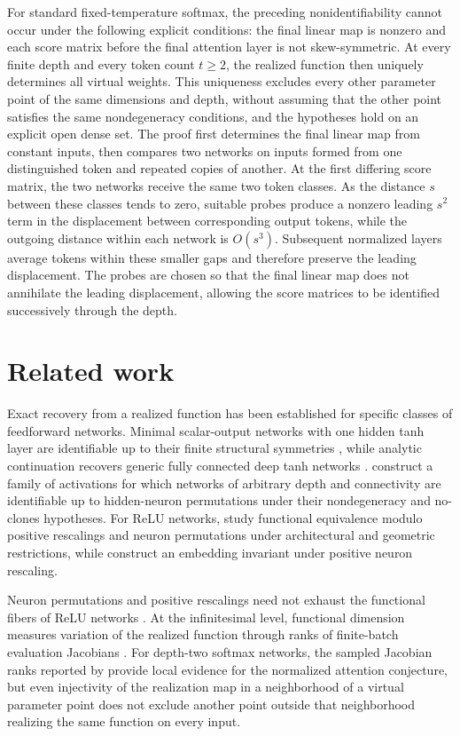 \documentclass[mlmain]{jmlr}
\begin{document}
For standard fixed-temperature softmax, the preceding nonidentifiability
cannot occur under the following explicit conditions: the final linear map
is nonzero and each score matrix before the final attention layer is not
skew-symmetric.  At every finite depth and every token count $t\ge2$, the
realized function then uniquely determines all virtual weights.  This
uniqueness excludes every other parameter point of the same dimensions and
depth, without assuming that the other point satisfies the same
nondegeneracy conditions, and the hypotheses hold on an explicit open dense
set.  The proof first determines the final linear map from constant inputs,
then compares two networks on inputs formed from one distinguished token
and repeated copies of another.  At the first differing score matrix, the
two networks receive the same two token classes.  As the distance $s$
between these classes tends to zero, suitable probes produce a nonzero
leading $s^2$ term in the displacement between corresponding output tokens,
while the outgoing distance within each network is $O(s^3)$.  Subsequent
normalized layers average tokens within these smaller gaps and therefore
preserve the leading displacement.  The probes are chosen so that the final
linear map does not annihilate the leading displacement, allowing the score
matrices to be identified successively through the depth.

\section{Related work}
\label{sec:related}
Exact recovery from a realized function has been established for specific
classes of feedforward networks.  Minimal scalar-output networks with one
hidden tanh layer are identifiable up to their finite structural symmetries
\citep{sussmann1992}, while analytic continuation recovers generic fully
connected deep tanh networks \citep{fefferman1994}.
\citet[Theorem~1]{vlacic2022} construct a family of activations for which
networks of arbitrary depth and connectivity are identifiable up to
hidden-neuron permutations under their nondegeneracy and no-clones
hypotheses.  For ReLU networks, \citet{phuong2020} study functional
equivalence modulo positive rescalings and neuron permutations under
architectural and geometric restrictions, while \citet{stock2023} construct
an embedding invariant under positive neuron rescaling.

Neuron permutations and positive rescalings need not exhaust the functional
fibers of ReLU networks \citep{grigsby2023}.  At the infinitesimal level,
functional dimension measures variation of the realized function through
ranks of finite-batch evaluation Jacobians
\citep{grigsby2026functionaldimension,grigsby2024persistent}.
For depth-two softmax networks, the sampled Jacobian ranks reported by
\citet{henry2025} provide local evidence for the normalized attention
conjecture, but even injectivity of the realization map in a neighborhood of
a virtual parameter point does not exclude another point outside that
neighborhood realizing the same function on every input.
\end{document}
